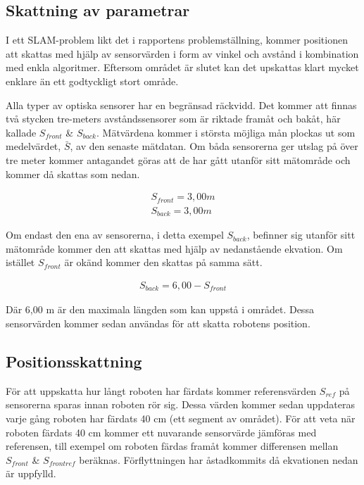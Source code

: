 \documentclass[a4paper,12pt,fleqn]{article}
\begin{document}
\subsection{Skattning av parametrar}

I ett SLAM-problem likt det i rapportens problemställning, kommer positionen att skattas med hjälp av sensorvärden i form av vinkel och avstånd i kombination med enkla algoritmer. Eftersom området är slutet kan det upskattas klart mycket enklare än ett godtyckligt stort område. 

Alla typer av optiska sensorer har en begränsad räckvidd. Det kommer att finnas två stycken tre-meters avståndssensorer som är riktade framåt och bakåt, här kallade $S_{front}$ \& $S_{back}$. Mätvärdena kommer i största möjliga mån plockas ut som medelvärdet, $\bar{S}$, av den senaste mätdatan. Om båda sensorerna ger utslag på över tre meter kommer antagandet göras att de har gått utanför sitt mätområde och kommer då skattas som nedan. 

\begin{gather}
	S_{front}=3,00 m \\
	S_{back}=3,00 m
\end{gather}

Om endast den ena av sensorerna, i detta exempel $S_{back}$, befinner sig utanför sitt mätområde kommer den att skattas med hjälp av nedanstående ekvation. Om istället $S_{front}$ är okänd kommer den skattas på samma sätt. 

\begin{gather}
	S_{back}=6,00-S_{front}
\end{gather}

Där 6,00 m är den maximala längden som kan uppstå i området. Dessa sensorvärden kommer sedan användas för att skatta robotens position.



\subsection{Positionsskattning}

För att uppskatta hur långt roboten har färdats kommer referensvärden $S_{ref}$ på sensorerna sparas innan roboten rör sig. Dessa värden kommer sedan uppdateras varje gång roboten har färdats 40 cm (ett segment av området). För att veta när roboten färdats 40 cm kommer ett nuvarande sensorvärde jämföras med referensen, till exempel om roboten färdas framåt kommer differensen mellan $S_{front}$ \& $S_{frontref}$ beräknas. Förflyttningen har åstadkommits då ekvationen nedan är uppfylld. 
\end{document}
